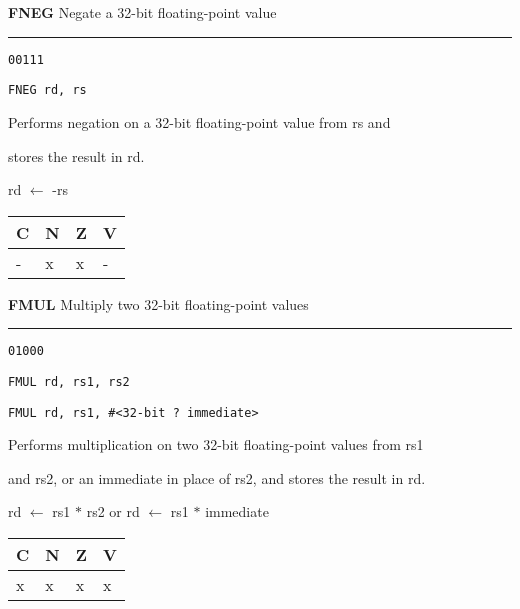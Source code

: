 \documentclass{article}
\begin{document}
\bigskip\bigskip

\flushleft
\LARGE\textbf{FNEG} \large \hfill Negate a 32-bit floating-point value

\kern-3pt
\noindent\rule{16.5cm}{0.4pt}
\normalsize

{\large
	 \texttt{00111} \par
	\smallbreak
	 \texttt{FNEG rd, rs} \par
	\smallbreak
	 Performs negation on a 32-bit floating-point value from rs and \par
	\makebox[3.5cm][l]{  } stores the result in rd. \par
	\smallbreak
	 rd $\leftarrow$ -rs \par 
	\smallbreak
	 \begin{tabular}{llll} C \quad & N \quad & Z \quad & V \\ \hline - & x & x & - \\ \end{tabular}
}

\pagebreak

\flushleft
\LARGE\textbf{FMUL} \large \hfill Multiply two 32-bit floating-point values

\kern-3pt
\noindent\rule{16.5cm}{0.4pt}
\normalsize

{\large
	 \texttt{01000} \par
	\smallbreak
	 \texttt{FMUL rd, rs1, rs2} \par
	\smallbreak
	 \texttt{FMUL rd, rs1, \#<32-bit ? immediate>} \par
	\smallbreak
	 Performs multiplication on two 32-bit floating-point values from rs1 \par
	\makebox[3.5cm][l]{  } and rs2, or an immediate in place of rs2, and stores the result in rd. \par
	\smallbreak
	 rd $\leftarrow$ rs1 $*$ rs2 \quad or \quad rd $\leftarrow$ rs1 $*$ immediate\par
	\smallbreak
	 \begin{tabular}{llll} C \quad & N \quad & Z \quad & V \\ \hline x & x & x & x \\ \end{tabular}
}
\end{document}
